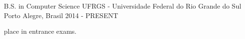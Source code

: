 \begin{cventries}
  \cventry
    {B.S. in Computer Science}
    {UFRGS - Universidade Federal do Rio Grande do Sul}
    {Porto Alegre, Brasil}
    {2014 - PRESENT}
    {
      \begin{cvitems}
        \item { place in entrance exams.}
      \end{cvitems}
    }
\end{cventries}

